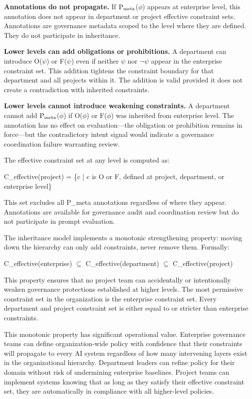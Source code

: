\textbf{Annotations do not propagate.} If $\mathrm{P_{meta}}$($\phi$) appears at enterprise level, this annotation does not appear in department or project effective constraint sets. Annotations are governance metadata scoped to the level where they are defined. They do not participate in inheritance.

\textbf{Lower levels can add obligations or prohibitions.} A department can introduce O($\psi$) or F($\psi$) even if neither $\psi$ nor $\neg$$\psi$ appear in the enterprise constraint set. This addition tightens the constraint boundary for that department and all projects within it. The addition is valid provided it does not create a contradiction with inherited constraints.

\textbf{Lower levels cannot introduce weakening constraints.} A department cannot add $\mathrm{P_{meta}}$($\phi$) if O($\phi$) or F($\phi$) was inherited from enterprise level. The annotation has no effect on evaluation---the obligation or prohibition remains in force---but the contradictory intent signal would indicate a governance coordination failure warranting review.

The effective constraint set at any level is computed as:

\begin{claddisp}
C\_effective(project) = \{c | c is O or F, defined at project, department, or enterprise level\}
\end{claddisp}


This set excludes all P\_\allowbreak{}meta annotations regardless of where they appear. Annotations are available for governance audit and coordination review but do not participate in prompt evaluation.

The inheritance model implements a monotonic strengthening property: moving down the hierarchy can only add constraints, never remove them. Formally:

\begin{claddisp}
C\_effective(enterprise) $\subseteq$ C\_effective(department) $\subseteq$ C\_effective(project)
\end{claddisp}


This property ensures that no project team can accidentally or intentionally weaken governance protections established at higher levels. The most permissive constraint set in the organization is the enterprise constraint set. Every department and project constraint set is either equal to or stricter than enterprise constraints.

This monotonic property has significant operational value. Enterprise governance teams can define organization-wide policy with confidence that their constraints will propagate to every AI system regardless of how many intervening layers exist in the organizational hierarchy. Department leaders can refine policy for their domain without risk of undermining enterprise baselines. Project teams can implement systems knowing that as long as they satisfy their effective constraint set, they are automatically in compliance with all higher-level policies.

